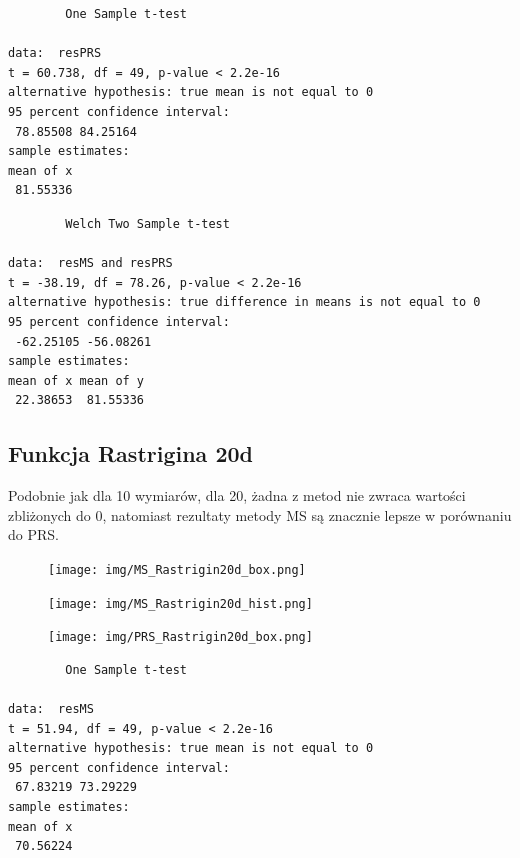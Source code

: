 \documentclass{article}
\begin{document}
\begin{verbatim}
        One Sample t-test

data:  resPRS
t = 60.738, df = 49, p-value < 2.2e-16
alternative hypothesis: true mean is not equal to 0
95 percent confidence interval:
 78.85508 84.25164
sample estimates:
mean of x
 81.55336
\end{verbatim}

\vspace{50pt}

\begin{verbatim}
        Welch Two Sample t-test

data:  resMS and resPRS
t = -38.19, df = 78.26, p-value < 2.2e-16
alternative hypothesis: true difference in means is not equal to 0
95 percent confidence interval:
 -62.25105 -56.08261
sample estimates:
mean of x mean of y
 22.38653  81.55336

\end{verbatim}


\newpage

\subsection{Funkcja Rastrigina 20d}

\hspace{0.5cm} Podobnie jak dla 10 wymiarów, dla 20, żadna z metod nie zwraca wartości zbliżonych do 0, natomiast rezultaty metody MS są znacznie lepsze w porównaniu do PRS.

\begin{figure}[H]
    \centering
    \texttt{[image: img/MS\_Rastrigin20d\_box.png]}
    \label{fig:ackley}
\end{figure}

\begin{figure}[H]
    \centering
    \texttt{[image: img/MS\_Rastrigin20d\_hist.png]}
    \label{fig:ackley}
\end{figure}

\begin{figure}[H]
    \centering
    \texttt{[image: img/PRS\_Rastrigin20d\_box.png]}
    \label{fig:ackley}
\end{figure}

\begin{figure}[H]
    \centering
    \label{fig:ackley}
\end{figure}

\newpage
\vspace{25pt}

\begin{verbatim}
        One Sample t-test

data:  resMS
t = 51.94, df = 49, p-value < 2.2e-16
alternative hypothesis: true mean is not equal to 0
95 percent confidence interval:
 67.83219 73.29229
sample estimates:
mean of x
 70.56224
\end{verbatim}
\end{document}
